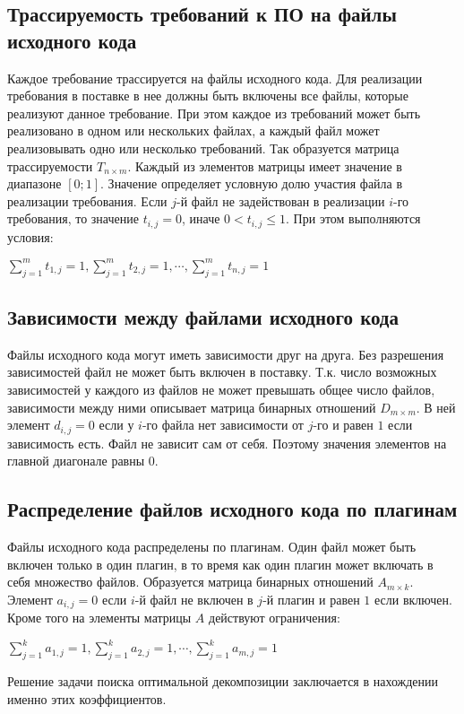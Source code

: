 \subsection*{Трассируемость требований к ПО на файлы исходного кода}
Каждое требование трассируется на файлы исходного кода. Для реализации требования в поставке в нее должны быть включены все файлы, которые реализуют данное требование. При этом каждое из требований может быть реализовано в одном или нескольких файлах, а каждый файл может реализовывать одно или несколько требований. Так образуется матрица трассируемости $T_{n \times m}$. Каждый из элементов матрицы имеет значение в диапазоне $[0;1]$. Значение определяет условную долю участия файла в реализации требования. Если $j$-й файл не задействован в реализации $i$-го требования, то значение $t_{i, j} = 0$, иначе $0 < t_{i, j} \le 1$. При этом выполняются условия:
\begin{center}
  $\displaystyle \sum^{m}_{j = 1}t_{1, j} = 1, 
    \sum^{m}_{j = 1}t_{2, j} = 1, \cdots, \sum^{m}_{j = 1}t_{n, j} = 1$
\end{center}

\subsection*{Зависимости между файлами исходного кода}
Файлы исходного кода могут иметь зависимости друг на друга. Без разрешения зависимостей файл не может быть включен в поставку. Т.к. число возможных зависимостей у каждого из файлов не может превышать общее число файлов, зависимости между ними описывает матрица бинарных отношений $D_{m \times m}$. В ней элемент $d_{i, j} = 0$ если у $i$-го файла нет зависимости от $j$-го и равен $1$ если зависимость есть. Файл не зависит сам от себя. Поэтому значения элементов на главной диагонале равны $0$.

\subsection*{Распределение файлов исходного кода по плагинам}
Файлы исходного кода распределены по плагинам. Один файл может быть включен только в один плагин, в то время как один плагин может включать в себя множество файлов. Образуется матрица бинарных отношений $A_{m \times k}$. Элемент $a_{i, j} = 0$ если $i$-й файл не включен в $j$-й плагин и равен $1$ если включен. Кроме того на элементы матрицы $A$ действуют ограничения:
\begin{center}
  $\displaystyle \sum^{k}_{j = 1}a_{1, j} = 1, \sum^{k}_{j = 1}a_{2, j} = 1, \cdots, \sum^{k}_{j = 1}a_{m, j} = 1$
\end{center}
Решение задачи поиска оптимальной декомпозиции заключается в нахождении именно этих коэффициентов.

